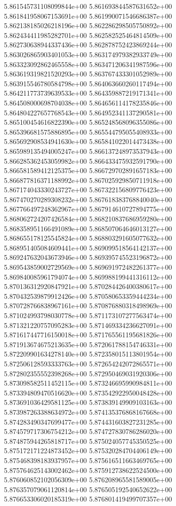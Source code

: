 5.861545731108099844e+00
5.861693844587631652e+00
5.861841958067153691e+00
5.861990071546686387e+00
5.862138185026218196e+00
5.862286298505750892e+00
5.862434411985282701e+00
5.862582525464814509e+00
5.862730638944337436e+00
5.862878752423869244e+00
5.863026865903401053e+00
5.863174979382933749e+00
5.863323092862465558e+00
5.863471206341987596e+00
5.863619319821520293e+00
5.863767433301052989e+00
5.863915546780584798e+00
5.864063660260117494e+00
5.864211773739639533e+00
5.864359887219171341e+00
5.864508000698704038e+00
5.864656114178235846e+00
5.864804227657768543e+00
5.864952341137290581e+00
5.865100454616822390e+00
5.865248568096355086e+00
5.865396681575886895e+00
5.865544795055408933e+00
5.865692908534941630e+00
5.865841022014473438e+00
5.865989135494005247e+00
5.866137248973537943e+00
5.866285362453059982e+00
5.866433475932591790e+00
5.866581589412125375e+00
5.866729702891657183e+00
5.866877816371188992e+00
5.867025929850711918e+00
5.867174043330243727e+00
5.867322156809776423e+00
5.867470270289308232e+00
5.867618383768840040e+00
5.867766497248362967e+00
5.867914610727894775e+00
5.868062724207426584e+00
5.868210837686959280e+00
5.868358951166491089e+00
5.868507064646013127e+00
5.868655178125545824e+00
5.868803291605077632e+00
5.868951405084609441e+00
5.869099518564142137e+00
5.869247632043673946e+00
5.869395745523196872e+00
5.869543859002729569e+00
5.869691972482261377e+00
5.869840085961794074e+00
5.869988199441316112e+00
5.870136312920847921e+00
5.870284426400380617e+00
5.870432539879912426e+00
5.870580653359444234e+00
5.870728766838967161e+00
5.870876880318498969e+00
5.871024993798030778e+00
5.871173107277563474e+00
5.871321220757095283e+00
5.871469334236627091e+00
5.871617447716150018e+00
5.871765561195681826e+00
5.871913674675213635e+00
5.872061788154746331e+00
5.872209901634278140e+00
5.872358015113801954e+00
5.872506128593333763e+00
5.872654242072865571e+00
5.872802355552398268e+00
5.872950469031920306e+00
5.873098582511452115e+00
5.873246695990984811e+00
5.873394809470516620e+00
5.873542922950048428e+00
5.873691036429581125e+00
5.873839149909103163e+00
5.873987263388634972e+00
5.874135376868167668e+00
5.874283490347699477e+00
5.874431603827231285e+00
5.874579717306754212e+00
5.874727830786286020e+00
5.874875944265818717e+00
5.875024057745350525e+00
5.875172171224873452e+00
5.875320284704406149e+00
5.875468398183937957e+00
5.875616511663469765e+00
5.875764625143002462e+00
5.875912738622524500e+00
5.876060852102056309e+00
5.876208965581589005e+00
5.876357079061120814e+00
5.876505192540652622e+00
5.876653306020185319e+00
5.876801419499707357e+00
